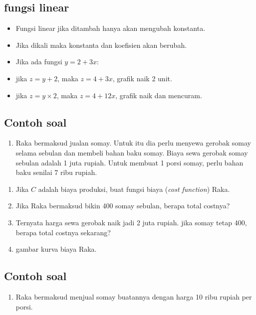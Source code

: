 \documentclass[
  letterpaper,
  DIV=11,
  numbers=noendperiod]{scrartcl}
\providecommand{\tightlist}{%
  \setlength{\itemsep}{0pt}\setlength{\parskip}{0pt}}\usepackage{longtable,booktabs,array}
\begin{document}
\subsection{fungsi linear}\label{fungsi-linear-3}

\begin{itemize}
\item
  Fungsi linear jika ditambah hanya akan mengubah konstanta.
\item
  Jika dikali maka konstanta dan koefisien akan berubah.
\item
  Jika ada fungsi \(y=2+3x\):
\item
  jika \(z=y+2\), maka \(z=4+3x\), grafik naik 2 unit.
\item
  jika \(z=y \times 2\), maka \(z=4+12x\), grafik naik dan mencuram.
\end{itemize}

\subsection{Contoh soal}\label{contoh-soal-1}

\begin{enumerate}
\def\labelenumi{\arabic{enumi}.}
\tightlist
\item
  Raka bermaksud jualan somay. Untuk itu dia perlu menyewa gerobak somay
  selama sebulan dan membeli bahan baku somay. Biaya sewa gerobak somay
  sebulan adalah 1 juta rupiah. Untuk membuat 1 porsi somay, perlu bahan
  baku senilai 7 ribu rupiah.
\end{enumerate}

\begin{enumerate}
\def\labelenumi{\alph{enumi}.}
\tightlist
\item
  Jika \(C\) adalah biaya produksi, buat fungsi biaya (\emph{cost
  function}) Raka.
\item
  Jika Raka bermaksud bikin 400 somay sebulan, berapa total costnya?
\item
  Ternyata harga sewa gerobak naik jadi 2 juta rupiah. jika somay tetap
  400, berapa total costnya sekarang?
\item
  gambar kurva biaya Raka.
\end{enumerate}

\subsection{Contoh soal}\label{contoh-soal-2}

\begin{enumerate}
\def\labelenumi{\arabic{enumi}.}
\setcounter{enumi}{1}
\tightlist
\item
  Raka bermaksud menjual somay buatannya dengan harga 10 ribu rupiah per
  porsi.
\end{enumerate}
\end{document}
